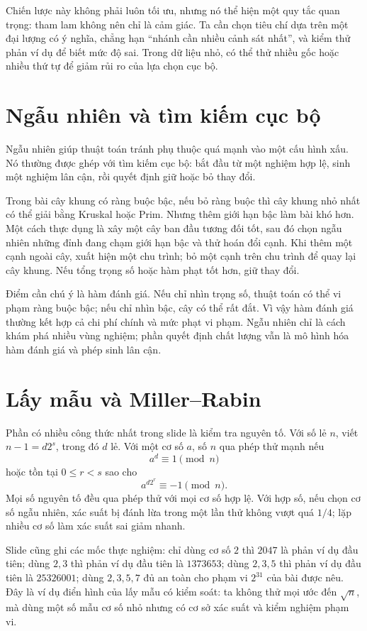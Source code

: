 \documentclass[11pt]{article}
\begin{document}
Chiến lược này không phải luôn tối ưu, nhưng nó thể hiện một quy tắc quan
trọng: tham lam không nên chỉ là cảm giác. Ta cần chọn tiêu chí dựa trên một
đại lượng có ý nghĩa, chẳng hạn ``nhánh cần nhiều cảnh sát nhất'', và kiểm
thử phản ví dụ để biết mức độ sai. Trong dữ liệu nhỏ, có thể thử nhiều gốc
hoặc nhiều thứ tự để giảm rủi ro của lựa chọn cục bộ.

\section{Ngẫu nhiên và tìm kiếm cục bộ}

Ngẫu nhiên giúp thuật toán tránh phụ thuộc quá mạnh vào một cấu hình xấu. Nó
thường được ghép với tìm kiếm cục bộ: bắt đầu từ một nghiệm hợp lệ, sinh một
nghiệm lân cận, rồi quyết định giữ hoặc bỏ thay đổi.

Trong bài cây khung có ràng buộc bậc, nếu bỏ ràng buộc thì cây khung nhỏ nhất
có thể giải bằng Kruskal hoặc Prim. Nhưng thêm giới hạn bậc làm bài khó hơn.
Một cách thực dụng là xây một cây ban đầu tương đối tốt, sau đó chọn ngẫu
nhiên những đỉnh đang chạm giới hạn bậc và thử hoán đổi cạnh. Khi thêm một
cạnh ngoài cây, xuất hiện một chu trình; bỏ một cạnh trên chu trình để quay
lại cây khung. Nếu tổng trọng số hoặc hàm phạt tốt hơn, giữ thay đổi.

Điểm cần chú ý là hàm đánh giá. Nếu chỉ nhìn trọng số, thuật toán có thể vi
phạm ràng buộc bậc; nếu chỉ nhìn bậc, cây có thể rất đắt. Vì vậy hàm đánh giá
thường kết hợp cả chi phí chính và mức phạt vi phạm. Ngẫu nhiên chỉ là cách
khám phá nhiều vùng nghiệm; phần quyết định chất lượng vẫn là mô hình hóa
hàm đánh giá và phép sinh lân cận.

\section{Lấy mẫu và Miller--Rabin}

Phần có nhiều công thức nhất trong slide là kiểm tra nguyên tố. Với số lẻ
\(n\), viết \(n-1=d2^s\), trong đó \(d\) lẻ. Với một cơ số \(a\), số \(n\) qua
phép thử mạnh nếu
\[
  a^d\equiv 1\pmod n
\]
hoặc tồn tại \(0\le r<s\) sao cho
\[
  a^{d2^r}\equiv -1\pmod n.
\]
Mọi số nguyên tố đều qua phép thử với mọi cơ số hợp lệ. Với hợp số, nếu chọn
cơ số ngẫu nhiên, xác suất bị đánh lừa trong một lần thử không vượt quá
\(1/4\); lặp nhiều cơ số làm xác suất sai giảm nhanh.

Slide cũng ghi các mốc thực nghiệm: chỉ dùng cơ số \(2\) thì \(2047\) là phản
ví dụ đầu tiên; dùng \(2,3\) thì phản ví dụ đầu tiên là \(1373653\); dùng
\(2,3,5\) thì phản ví dụ đầu tiên là \(25326001\); dùng \(2,3,5,7\) đủ an
toàn cho phạm vi \(2^{31}\) của bài được nêu. Đây là ví dụ điển hình của lấy
mẫu có kiểm soát: ta không thử mọi ước đến \(\sqrt n\), mà dùng một số mẫu cơ
số nhỏ nhưng có cơ sở xác suất và kiểm nghiệm phạm vi.
\end{document}
